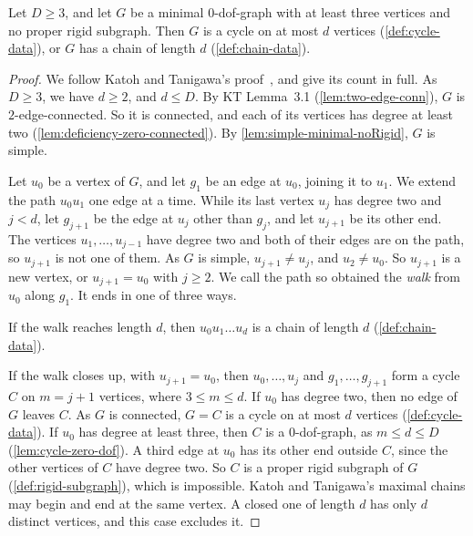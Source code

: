 \begin{lemma}
  \label{lem:chain-cycle-dichotomy}
  \leanok
  Let $D \ge 3$, and let $G$ be a minimal $0$-dof-graph with at least
  three vertices and no proper rigid subgraph. Then $G$ is a cycle on at
  most $d$ vertices (\cref{def:cycle-data}), or $G$ has a chain of length
  $d$ (\cref{def:chain-data}).
\end{lemma}
\begin{proof}
  \leanok
  We follow Katoh and Tanigawa's
  proof~\cite[pp.~664--665]{katohTanigawa2011}, and give its count in
  full. As $D \ge 3$, we have $d \ge 2$, and $d \le D$. By KT Lemma~3.1
  (\cref{lem:two-edge-conn}), $G$ is $2$-edge-connected. So it is
  connected, and each of its vertices has degree at least two
  (\cref{lem:deficiency-zero-connected}). By
  \cref{lem:simple-minimal-noRigid}, $G$ is simple.

  Let $u_0$ be a vertex of $G$, and let $g_1$ be an edge at $u_0$,
  joining it to $u_1$. We extend the path $u_0 u_1$ one edge at a time.
  While its last vertex $u_j$ has degree two and $j < d$, let $g_{j+1}$
  be the edge at $u_j$ other than $g_j$, and let $u_{j+1}$ be its other
  end. The vertices $u_1, \dots, u_{j-1}$ have degree two and both of
  their edges are on the path, so $u_{j+1}$ is not one of them. As $G$ is
  simple, $u_{j+1} \neq u_j$, and $u_2 \neq u_0$. So $u_{j+1}$ is a new
  vertex, or $u_{j+1} = u_0$ with $j \ge 2$. We call the path so obtained
  the \emph{walk} from $u_0$ along $g_1$. It ends in one of three ways.

  If the walk reaches length $d$, then $u_0 u_1 \dots u_d$ is a chain of
  length $d$ (\cref{def:chain-data}).

  If the walk closes up, with $u_{j+1} = u_0$, then $u_0, \dots, u_j$ and
  $g_1, \dots, g_{j+1}$ form a cycle $C$ on $m = j + 1$ vertices, where
  $3 \le m \le d$. If $u_0$ has degree two, then no edge of $G$ leaves
  $C$. As $G$ is connected, $G = C$ is a cycle on at most $d$ vertices
  (\cref{def:cycle-data}). If $u_0$ has degree at least three, then $C$
  is a $0$-dof-graph, as $m \le d \le D$ (\cref{lem:cycle-zero-dof}).
  A third edge at $u_0$ has its other end outside $C$, since the other
  vertices of $C$ have degree two. So $C$ is a proper rigid subgraph of
  $G$ (\cref{def:rigid-subgraph}), which is impossible. Katoh and Tanigawa's maximal chains may begin and
  end at the same vertex. A closed one of length $d$ has only $d$
  distinct vertices, and this case excludes it.


\end{proof}
